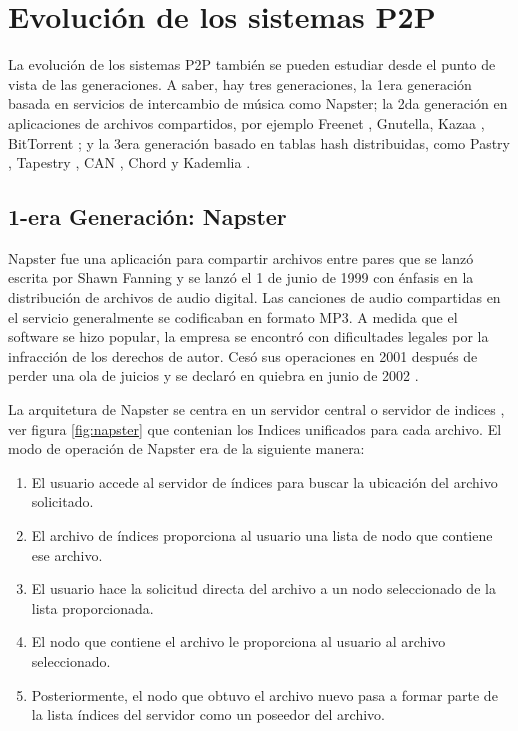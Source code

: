  \section{Evoluci\'on de los sistemas P2P}
La evoluci\'on de los sistemas P2P tambi\'en se pueden estudiar desde el punto de vista de las generaciones. A saber, hay tres generaciones, la 1era generaci\'on basada en servicios de intercambio de m\'usica como Napster; la 2da generaci\'on en aplicaciones de archivos compartidos, por ejemplo Freenet \cite{Clarke2001}, Gnutella, Kazaa \cite{Leibowitz2003}, BitTorrent \cite{Cohen2003}; y la 3era generaci\'on basado en tablas hash distribuidas, como  Pastry  \cite{Rowstron2001}, Tapestry   \cite{Zhao2001}, 
CAN  \cite{Ratnasamy2001}, Chord   \cite{Stoica2001} y Kademlia  \cite{Maymounkov2002}.



 \subsection{ 1-era Generación: Napster}  
  	   	
  	
 Napster fue una aplicación para compartir archivos entre pares que se lanzó escrita  por Shawn Fanning   y se lanz\'o el 1 de junio de 1999 con énfasis en la distribución de archivos de audio digital. Las canciones de audio compartidas en el servicio generalmente se codificaban en formato MP3.  A medida que el software se hizo popular, la empresa se encontró con dificultades legales por la infracción de los derechos de autor. Cesó sus operaciones en 2001 después de perder una ola de juicios y se declaró en quiebra en junio de 2002  	 .
 
 La arquitetura de Napster se centra en un servidor central o  
 servidor de indices , ver figura \ref{fig:napster} que contenian los 
 Indices unificados para cada archivo.  
 El modo de operaci\'on de Napster era de la siguiente manera:
 
 \begin{enumerate}
 	\item El usuario accede al servidor de \'indices para buscar la ubicaci\'on del archivo solicitado.
 	\item El archivo de \'indices proporciona al usuario una lista de nodo que contiene ese archivo.
 	\item El usuario  hace la solicitud directa  del archivo a un nodo seleccionado de la lista proporcionada. 
 	\item El nodo que contiene el archivo le proporciona al usuario al archivo seleccionado.
 	\item Posteriormente, el nodo que obtuvo el archivo nuevo pasa a formar parte de la lista \'indices del servidor como un poseedor del archivo.
 \end{enumerate}
 
